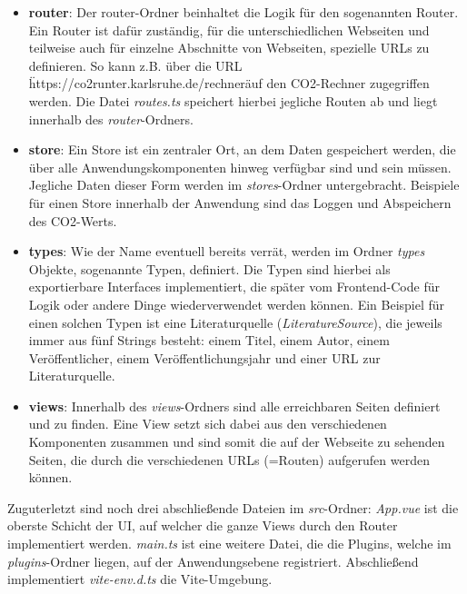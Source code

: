 \begin{itemize}
    \item \textbf{router}: Der router-Ordner beinhaltet die Logik für den sogenannten Router. Ein Router ist dafür zuständig, für die unterschiedlichen Webseiten und teilweise auch für einzelne Abschnitte von Webseiten, spezielle URLs zu definieren. So kann z.B. über die URL \"https://co2runter.karlsruhe.de/rechner\" auf den CO2-Rechner zugegriffen werden. Die Datei \textit{routes.ts} speichert hierbei jegliche Routen ab und liegt innerhalb des \textit{router}-Ordners.
    \item \textbf{store}: Ein Store ist ein zentraler Ort, an dem Daten gespeichert werden, die über alle Anwendungskomponenten hinweg verfügbar sind und sein müssen. Jegliche Daten dieser Form werden im \textit{stores}-Ordner untergebracht. Beispiele für einen Store innerhalb der Anwendung sind das Loggen und Abspeichern des CO2-Werts.
    \item \textbf{types}: Wie der Name eventuell bereits verrät, werden im Ordner \textit{types} Objekte, sogenannte Typen, definiert. Die Typen sind hierbei als exportierbare Interfaces implementiert, die später vom Frontend-Code für Logik oder andere Dinge wiederverwendet werden können. Ein Beispiel für einen solchen Typen ist eine Literaturquelle (\textit{LiteratureSource}), die jeweils immer aus fünf Strings besteht: einem Titel, einem Autor, einem Veröffentlicher, einem Veröffentlichungsjahr und einer URL zur Literaturquelle.
    \item \textbf{views}: Innerhalb des \textit{views}-Ordners sind alle erreichbaren Seiten definiert und zu finden. Eine View setzt sich dabei aus den verschiedenen Komponenten zusammen und sind somit die auf der Webseite zu sehenden Seiten, die durch die verschiedenen URLs (=Routen) aufgerufen werden können.
\end{itemize}

Zuguterletzt sind noch drei abschließende Dateien im \textit{src}-Ordner: \textit{App.vue} ist die oberste Schicht der UI, auf welcher die ganze Views durch den Router implementiert werden. \textit{main.ts} ist eine weitere Datei, die die Plugins, welche im \textit{plugins}-Ordner liegen, auf der Anwendungsebene registriert. Abschließend implementiert \textit{vite-env.d.ts} die Vite-Umgebung.

